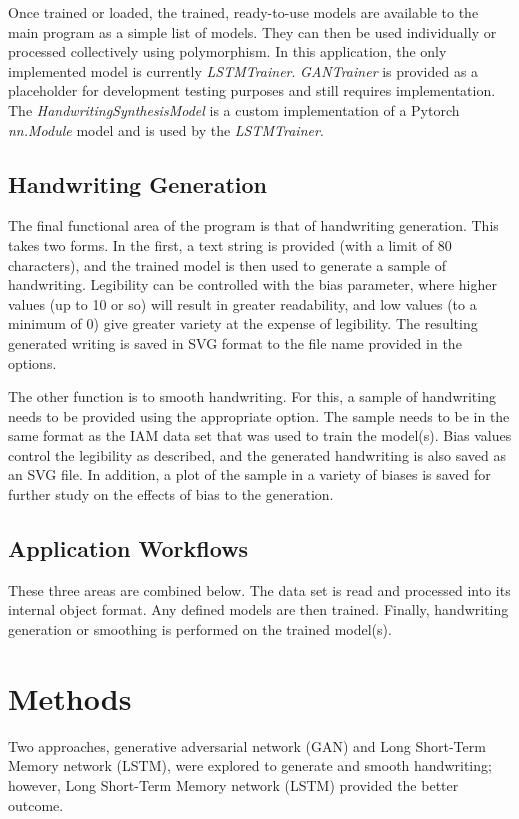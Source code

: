 \documentclass{article}
\begin{document}
Once trained or loaded, the trained, ready-to-use models are available to the main program as a simple list of models. They can then be used individually or processed collectively using polymorphism. In this application, the only implemented model is currently \textit{LSTMTrainer}. \textit{GANTrainer} is provided as a placeholder for development testing purposes and still requires implementation. The \textit{HandwritingSynthesisModel} is a custom implementation of a Pytorch \textit{nn.Module} model and is used by the \textit{LSTMTrainer}.

\subsection{Handwriting Generation}
The final functional area of the program is that of handwriting generation. This takes two forms. In the first, a text string is provided (with a limit of 80 characters), and the trained model is then used to generate a sample of handwriting. Legibility can be controlled with the bias parameter, where higher values (up to 10 or so) will result in greater readability, and low values (to a minimum of 0) give greater variety at the expense of legibility. The resulting generated writing is saved in SVG format to the file name provided in the options.

The other function is to smooth handwriting. For this, a sample of handwriting needs to be provided using the appropriate option. The sample needs to be in the same format as the IAM data set that was used to train the model(s). Bias values control the legibility as described, and the generated handwriting is also saved as an SVG file. In addition, a plot of the sample in a variety of biases is saved for further study on the effects of bias to the generation.

\subsection{Application Workflows}
These three areas are combined below. The data set is read and processed into its internal object format. Any defined models are then trained. Finally, handwriting generation or smoothing is performed on the trained model(s).

\section{Methods}
Two approaches, generative adversarial network (GAN) and Long Short-Term Memory network (LSTM), were explored to generate and smooth handwriting; however, Long Short-Term Memory network (LSTM) provided the better outcome.
\end{document}
